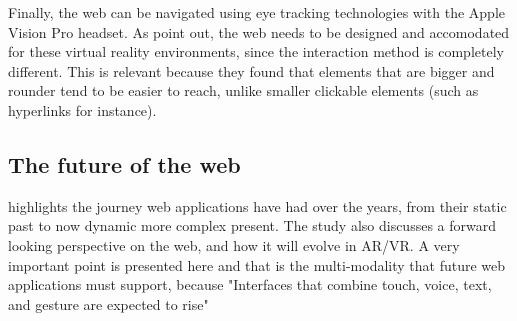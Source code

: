 Finally, the web can be navigated using eye tracking technologies with the Apple Vision Pro headset. As %
point out, the web needs to be designed and accomodated for these virtual reality environments, since the interaction method is completely different. This is relevant because they found that elements that are bigger and rounder tend to be easier to reach, unlike smaller clickable elements (such as hyperlinks for instance).


\subsection{The future of the web}

\cite{art:web-evolution-revolution-2024} highlights the journey web applications have had over the years, from their static past to now dynamic more complex present. The study also discusses a forward looking perspective on the web, and how it will evolve in AR/VR. A very important point is presented here and that is the multi-modality that future web applications must support, because "Interfaces that combine touch, voice, text, and gesture are expected to rise" \citep{art:web-evolution-revolution-2024}

